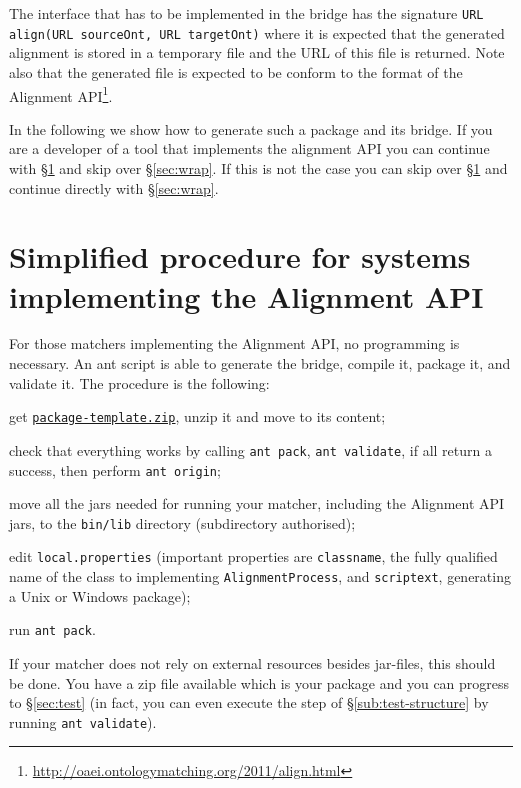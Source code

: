 \documentclass{article}
\def\file#1{\textcolor{grayy}{\texttt{#1}}}
\newcommand\smtt[1]{\texttt{\small #1}}
\begin{document}
The interface that has to be implemented in the bridge has the signature \verb|URL align(URL sourceOnt, URL targetOnt)| where it is expected that the generated alignment is stored in a temporary file and the URL of this file is returned. Note also that the generated file is expected to be conform to the format of the Alignment API\footnote{\url{http://oaei.ontologymatching.org/2011/align.html}}.

In the following we show how to generate such a package and its bridge. If you are a developer of a tool that implements the alignment API you can continue with \S\ref{sec:aapi} and skip over \S\ref{sec:wrap}. If this is not the case you can skip over \S\ref{sec:aapi} and continue directly with \S\ref{sec:wrap}.

\section{Simplified procedure for systems implementing the Alignment API}
\label{sec:aapi}

For those matchers implementing the Alignment API, no programming is necessary. An ant script is able to generate the bridge, compile it, package it, and validate it. The procedure is the following:
\begin{enumerate*}
\item get \href{http://oaei.ontologymatching.org/2011/tutorial/package-template.zip}{\nolinkurl{package-template.zip}}, unzip it and move to its content;

\item check that everything works by calling \smtt{ant pack}, \smtt{ant validate}, if all return a success, then perform \smtt{ant origin};
\item move all the jars needed for running your matcher, including the Alignment API jars, to the \file{bin/lib} directory (subdirectory authorised);
\item edit \smtt{local.properties} (important properties are \verb|classname|, the fully qualified name of the class to implementing \verb|AlignmentProcess|, and \verb|scriptext|, generating a Unix or Windows package);
\item run \verb|ant pack|.
\end{enumerate*}

If your matcher does not rely on external resources besides jar-files, this should be done. You have a zip file available which is your package and you can progress to \S\ref{sec:test} (in fact, you can even execute the step of \S\ref{sub:test-structure} by running \verb|ant validate|).
\end{document}

